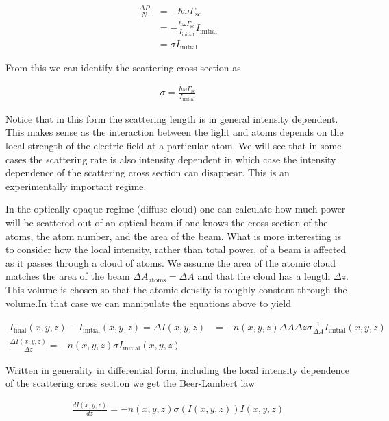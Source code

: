 \documentclass[12pt]{article}
\begin{document}
\begin{align}
\frac{\Delta P}{N} &= -\hbar \omega \Gamma_{\text{sc}}	\\
&= -\frac{\hbar \omega \Gamma_{\text{sc}}}{I_{\text{initial}}}I_{\text{initial}}\\
&= \sigma I_{\text{initial}}
\end{align}

From this we can identify the scattering cross section as

\begin{align}
\sigma = \frac{\hbar \omega \Gamma_{\text{sc}}}{I_{\text{initial}}}
\end{align}

Notice that in this form the scattering length is in general intensity dependent. This makes sense as the interaction between the light and atoms depends on the local strength of the electric field at a particular atom. We will see that in some cases the scattering rate is also intensity dependent in which case the intensity dependence of the scattering cross section can disappear. This is an experimentally important regime.

In the optically opaque regime (diffuse cloud) one can calculate how much power will be scattered out of an optical beam if one knows the cross section of the atoms, the atom number, and the area of the beam. What is more interesting is to consider how the local intensity, rather than total power, of a beam is affected as it passes through a cloud of atoms. We assume the area of the atomic cloud matches the area of the beam $\Delta A_{\text{atoms}} = \Delta A$ and that the cloud has a length $\Delta z$. This volume is chosen so that the atomic density is roughly constant through the volume.In that case we can manipulate the equations above to yield

\begin{align}
I_{\text{final}}(x,y,z) - I_{\text{initial}}(x,y,z) = \Delta I(x,y,z) &= - n(x,y,z) \Delta A \Delta z \sigma \frac{1}{\Delta A} I_{\text{initial}}(x,y,z)\\
\frac{\Delta I(x,y,z)}{\Delta z} = -n(x,y,z) \sigma I_{\text{initial}}(x,y,z)
\end{align}

Written in generality in differential form, including the local intensity dependence of the scattering cross section we get the Beer-Lambert law

\begin{align}
\frac{dI(x,y,z)}{dz} = -n(x,y,z) \sigma(I(x,y,z)) I(x,y,z)
\end{align}
\end{document}

